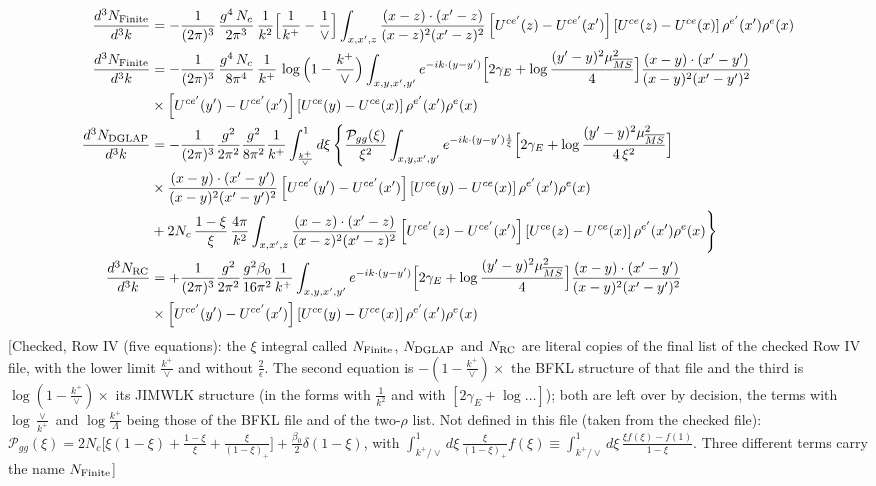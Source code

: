 \documentclass[9pt]{article}
\numberwithin{equation}{section}
\begin{document}
\begin{align} 
\frac{d^{3}N_{\rm Finite}}{d^{3}k} & = -\frac{1}{(2\pi)^{3}}\,\frac{g^{4}\,N_{c}}{2\pi^{3}}\,\frac{1}{k^{2}}\Big[\frac{1}{k^{+}}-\frac{1}{\vee}\Big]\int_{x,x',z}\frac{(x-z)\cdot(x'-z)}{(x-z)^{2}(x'-z)^{2}}\left[U^{ce'}(z) - U^{ce'}(x')\right]\left[U^{ce}(z) - U^{ce}(x)\right]\rho^{e'}(x')\rho^{e}(x)\notag \\ \frac{d^{3}N_{\rm Finite}}{d^{3}k} & = -\frac{1}{(2\pi)^{3}}\,\frac{g^{4}\,N_{c}}{8\pi^{4}}\,\frac{1}{k^{+}}\,\log\Big(1-\frac{k^{+}}{\vee}\Big)\int_{x,y,x',y'}e^{-ik\cdot(y-y')}\Big[2\gamma_{E}+\log\frac{(y'-y)^{2}\mu^{2}_{\overline{MS}}}{4}\Big]\frac{(x-y)\cdot(x'-y')}{(x-y)^{2}(x'-y')^{2}}\notag \\ & \times\left[U^{ce'}(y') - U^{ce'}(x')\right]\left[U^{ce}(y) - U^{ce}(x)\right]\rho^{e'}(x')\rho^{e}(x)\notag \\ \frac{d^{3}N_{\rm DGLAP}}{d^{3}k} & = -\frac{1}{(2\pi)^{3}}\frac{g^{2}}{2\pi^{2}}\frac{g^{2}}{8\pi^{2}}\frac{1}{k^{+}}\int_{\frac{k^{+}}{\vee}}^{1}d\xi\,\Bigg\{\frac{\mathcal P_{gg}(\xi)}{\xi^{2}}\int_{x,y,x',y'}e^{-ik\cdot(y-y')\frac{1}{\xi}}\Big[2\gamma_{E}+\log\frac{(y'-y)^{2}\mu^{2}_{\overline{MS}}}{4\,\xi^{2}}\Big]\notag \\ & \times\frac{(x-y)\cdot(x'-y')}{(x-y)^{2}(x'-y')^{2}}\left[U^{ce'}(y') - U^{ce'}(x')\right]\left[U^{ce}(y) - U^{ce}(x)\right]\rho^{e'}(x')\rho^{e}(x)\notag \\ & +2N_{c}\,\frac{1-\xi}{\xi}\,\frac{4\pi}{k^{2}}\int_{x,x',z}\frac{(x-z)\cdot(x'-z)}{(x-z)^{2}(x'-z)^{2}}\left[U^{ce'}(z) - U^{ce'}(x')\right]\left[U^{ce}(z) - U^{ce}(x)\right]\rho^{e'}(x')\rho^{e}(x)\Bigg\}\notag \\ \frac{d^{3}N_{\rm RC}}{d^{3}k} & = +\frac{1}{(2\pi)^{3}}\frac{g^{2}}{2\pi^{2}}\frac{g^{2}\beta_{0}}{16\pi^{2}}\frac{1}{k^{+}}\int_{x,y,x',y'}e^{-ik\cdot(y-y')}\Big[2\gamma_{E}+\log\frac{(y'-y)^{2}\mu^{2}_{\overline{MS}}}{4}\Big]\frac{(x-y)\cdot(x'-y')}{(x-y)^{2}(x'-y')^{2}}\notag \\ &\times\left[U^{ce'}(y') - U^{ce'}(x')\right]\left[U^{ce}(y) - U^{ce}(x)\right]\rho^{e'}(x')\rho^{e}(x)
\end{align} {\color{red}[Checked, Row IV (five equations): the $\xi$ integral called $N_{\rm Finite}$, $N_{\rm DGLAP}$ and $N_{\rm RC}$ are literal copies of the final list of the checked Row IV file, with the lower limit $\frac{k^{+}}{\vee}$ and without $\frac{2}{\epsilon}$. The second equation is $-(1-\frac{k^{+}}{\vee})\times$ the BFKL structure of that file and the third is $\log(1-\frac{k^{+}}{\vee})\times$ its JIMWLK structure (in the forms with $\frac{1}{k^{2}}$ and with $[2\gamma_{E}+\log\dots]$); both are left over by decision, the terms with $\log\frac{\vee}{k^{+}}$ and $\log\frac{k^{+}}{\Lambda}$ being those of the BFKL file and of the two-$\rho$ list. Not defined in this file (taken from the checked file): $\mathcal P_{gg}(\xi)=2N_{c}\big[\xi(1-\xi)+\frac{1-\xi}{\xi}+\frac{\xi}{(1-\xi)_{+}}\big]+\frac{\beta_{0}}{2}\delta(1-\xi)$, with $\int_{k^{+}/\vee}^{1}d\xi\,\frac{\xi}{(1-\xi)_{+}}f(\xi)\equiv\int_{k^{+}/\vee}^{1}d\xi\,\frac{\xi f(\xi)-f(1)}{1-\xi}$. Three different terms carry the name $N_{\rm Finite}$]}\par\noindent
\end{document}
